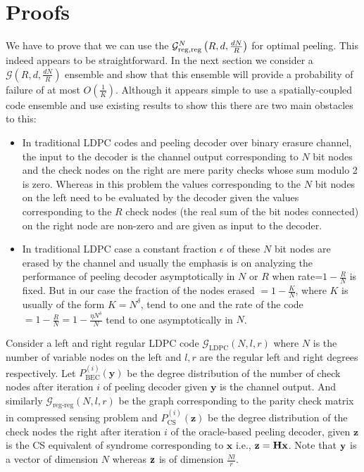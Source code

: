 \documentclass[journal,draft,onecolumn]{IEEEtran}
\begin{document}
\section{Proofs}
We have to prove that we can use the $\mathcal{G}^N_{\rm reg,reg}\left(R,d, \frac{dN}{R} \right)$ for optimal peeling. This indeed appears to be straightforward.
In the next section we consider a $\mathcal{G}(R,d,\frac{dN}{R})$ ensemble and show that this ensemble will provide a probability of failure of at most $O\left(\frac{1}{K}\right)$. Although it appears simple to use a spatially-coupled code ensemble and use existing results to show this there are two main obstacles to this:
\begin{itemize}
\item  In traditional LDPC codes and peeling decoder over binary erasure channel, the input to the decoder is the channel output corresponding to $N$ bit nodes and the check nodes on the right are mere parity checks whose sum modulo 2 is zero. Whereas in this problem the values corresponding to the $N$ bit nodes on the left need to be evaluated by the decoder given the values corresponding to the $R$ check nodes (the real sum of the bit nodes connected) on the right node are non-zero  and are given as input to the decoder.
\item  In traditional LDPC case a constant fraction $\epsilon$ of these $N$ bit nodes are erased by the channel and usually the emphasis is on analyzing the performance of peeling decoder asymptotically in $N$ or $R$ when rate=$1-\frac{R}{N}$ is fixed. But in our case the fraction of the nodes erased $=1-\frac{K}{N}$, where $K$ is usually of the form $K=N^{\delta}$, tend to one and the rate of the code$=1-\frac{R}{N}=1-\frac{\eta N^{\delta}}{N}$ tend to one asymptotically in $N$.
\end{itemize}

Consider a left and right regular LDPC code $\mathcal{G}_{\text{LDPC}}(N,l,r)$ where $N$ is the number of variable nodes on the left and $l,r$ are the regular left and right degrees respectively. Let $P_{\text{BEC}}^{(i)}(\mathbf{y})$ be the degree distribution of the number of check nodes after iteration $i$ of peeling decoder given $\mathbf{y}$ is the channel output. And similarly $\mathcal{G}_{\text{reg-reg}}(N,l,r)$ be the graph corresponding to the parity check matrix in compressed sensing problem and $P_{\text{CS}}^{(i)}(\mathbf{z})$ be the degree distribution of the check nodes the right after iteration $i$ of the oracle-based peeling decoder, given $\mathbf{z}$ is the CS equivalent of syndrome corresponding to $\mathbf{x}$ i.e., $\mathbf{z}=\mathbf{H}\mathbf{x}$. Note that $\mathbf{y}$ is a vector of dimension $N$ whereas $\mathbf{z}$ is of dimension $\frac{Nl}{r}$.\\
\end{document}
